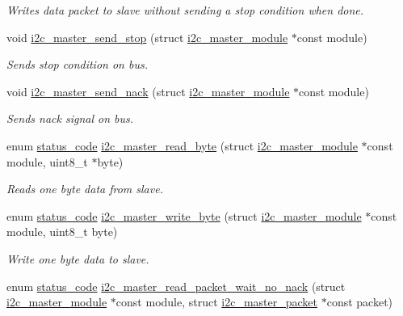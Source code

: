 \begin{DoxyCompactItemize}
\begin{DoxyCompactList}\small\item\em Writes data packet to slave without sending a stop condition when done. \end{DoxyCompactList}\item 
void \mbox{\hyperlink{group__asfdoc__sam0__sercom__i2c__group_ga6bddf9e717847b5fa8462596e7e1489c}{i2c\+\_\+master\+\_\+send\+\_\+stop}} (struct \mbox{\hyperlink{structi2c__master__module}{i2c\+\_\+master\+\_\+module}} $\ast$const module)
\begin{DoxyCompactList}\small\item\em Sends stop condition on bus. \end{DoxyCompactList}\item 
void \mbox{\hyperlink{group__asfdoc__sam0__sercom__i2c__group_gaf9bb3b3174c1fc602c3097bc40eadcef}{i2c\+\_\+master\+\_\+send\+\_\+nack}} (struct \mbox{\hyperlink{structi2c__master__module}{i2c\+\_\+master\+\_\+module}} $\ast$const module)
\begin{DoxyCompactList}\small\item\em Sends nack signal on bus. \end{DoxyCompactList}\item 
enum \mbox{\hyperlink{group__group__sam0__utils__status__codes_ga751c892e5a46b8e7d282085a5a5bf151}{status\+\_\+code}} \mbox{\hyperlink{group__asfdoc__sam0__sercom__i2c__group_ga54cf79ca8aa80e2163881ca4164e35f7}{i2c\+\_\+master\+\_\+read\+\_\+byte}} (struct \mbox{\hyperlink{structi2c__master__module}{i2c\+\_\+master\+\_\+module}} $\ast$const module, uint8\+\_\+t $\ast$byte)
\begin{DoxyCompactList}\small\item\em Reads one byte data from slave. \end{DoxyCompactList}\item 
enum \mbox{\hyperlink{group__group__sam0__utils__status__codes_ga751c892e5a46b8e7d282085a5a5bf151}{status\+\_\+code}} \mbox{\hyperlink{group__asfdoc__sam0__sercom__i2c__group_gaee2de09ec9474331f354eec703b80b6e}{i2c\+\_\+master\+\_\+write\+\_\+byte}} (struct \mbox{\hyperlink{structi2c__master__module}{i2c\+\_\+master\+\_\+module}} $\ast$const module, uint8\+\_\+t byte)
\begin{DoxyCompactList}\small\item\em Write one byte data to slave. \end{DoxyCompactList}\item 
enum \mbox{\hyperlink{group__group__sam0__utils__status__codes_ga751c892e5a46b8e7d282085a5a5bf151}{status\+\_\+code}} \mbox{\hyperlink{group__asfdoc__sam0__sercom__i2c__group_gae39b9f208966b0857f0bb61dc4dffd83}{i2c\+\_\+master\+\_\+read\+\_\+packet\+\_\+wait\+\_\+no\+\_\+nack}} (struct \mbox{\hyperlink{structi2c__master__module}{i2c\+\_\+master\+\_\+module}} $\ast$const module, struct \mbox{\hyperlink{structi2c__master__packet}{i2c\+\_\+master\+\_\+packet}} $\ast$const packet)
\end{DoxyCompactItemize}
